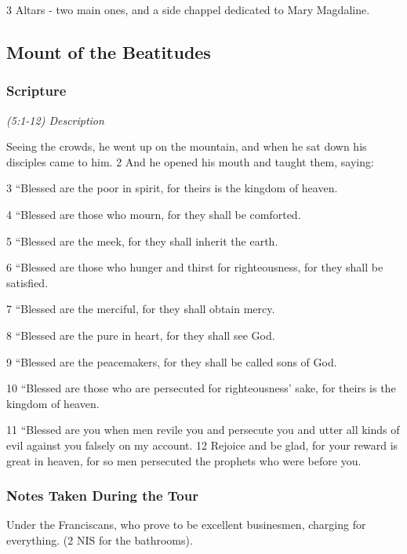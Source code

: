 \documentclass[letterpaper]{report}
\begin{document}
3 Altars - two main ones, and a side chappel dedicated to Mary Magdaline.

\clearpage
\subsection{Mount of the Beatitudes}
\begin{multicols}{2}
	\mbox{}
\end{multicols}
\subsubsection{Scripture}

{\centering
	\emph{(5:1-12) Description}\\
}
\begin{multicols}{2}
Seeing the crowds, he went up on the mountain, and when he sat down his disciples came to him. 2 And he opened his mouth and taught them, saying:

3 “Blessed are the poor in spirit, for theirs is the kingdom of heaven.

4 “Blessed are those who mourn, for they shall be comforted.

5 “Blessed are the meek, for they shall inherit the earth.

6 “Blessed are those who hunger and thirst for righteousness, for they shall be satisfied.

7 “Blessed are the merciful, for they shall obtain mercy.

8 “Blessed are the pure in heart, for they shall see God.

9 “Blessed are the peacemakers, for they shall be called sons of God.

10 “Blessed are those who are persecuted for righteousness’ sake, for theirs is the kingdom of heaven.

11 “Blessed are you when men revile you and persecute you and utter all kinds of evil against you falsely on my account. 12 Rejoice and be glad, for your reward is great in heaven, for so men persecuted the prophets who were before you.
\end{multicols}

\subsubsection{Notes Taken During the Tour}
Under the Franciscans, who prove to be excellent businesmen, charging for everything. (2 NIS for the bathrooms).
\end{document}
